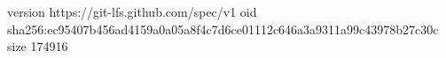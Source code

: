 version https://git-lfs.github.com/spec/v1
oid sha256:ec95407b456ad4159a0a05a8f4c7d6ce01112c646a3a9311a99c43978b27c30c
size 174916
